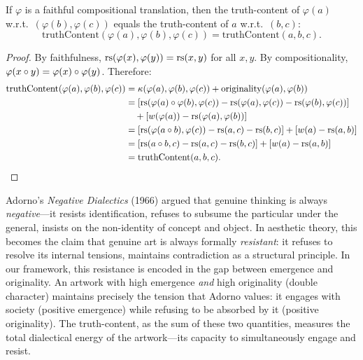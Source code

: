 \begin{theorem}
\label{thm:truth-faithful-translation}
If $\varphi$ is a faithful compositional translation, then the truth-content of $\varphi(a)$ w.r.t.\ $(\varphi(b), \varphi(c))$ equals the truth-content of $a$ w.r.t.\ $(b, c)$:
\[
  \mathrm{truthContent}(\varphi(a), \varphi(b), \varphi(c)) = \mathrm{truthContent}(a, b, c).
\]
\end{theorem}

\begin{proof}
By faithfulness, $\mathrm{rs}(\varphi(x), \varphi(y)) = \mathrm{rs}(x, y)$ for all $x, y$.  By compositionality, $\varphi(x \circ y) = \varphi(x) \circ \varphi(y)$.  Therefore:
\begin{align*}
  \mathrm{truthContent}(\varphi(a), \varphi(b), \varphi(c))
    &= \kappa(\varphi(a), \varphi(b), \varphi(c)) + \mathrm{originality}(\varphi(a), \varphi(b)) \\
    &= [\mathrm{rs}(\varphi(a) \circ \varphi(b), \varphi(c)) - \mathrm{rs}(\varphi(a), \varphi(c)) - \mathrm{rs}(\varphi(b), \varphi(c))] \\
    &\quad + [w(\varphi(a)) - \mathrm{rs}(\varphi(a), \varphi(b))] \\
    &= [\mathrm{rs}(\varphi(a \circ b), \varphi(c)) - \mathrm{rs}(a, c) - \mathrm{rs}(b, c)] + [w(a) - \mathrm{rs}(a, b)] \\
    &= [\mathrm{rs}(a \circ b, c) - \mathrm{rs}(a, c) - \mathrm{rs}(b, c)] + [w(a) - \mathrm{rs}(a, b)] \\
    &= \mathrm{truthContent}(a, b, c).
\end{align*}
\end{proof}

\begin{remark}
Adorno's \textit{Negative Dialectics} (1966) argued that genuine thinking is always \emph{negative}---it resists identification, refuses to subsume the particular under the general, insists on the non-identity of concept and object.  In aesthetic theory, this becomes the claim that genuine art is always formally \emph{resistant}: it refuses to resolve its internal tensions, maintains contradiction as a structural principle.  In our framework, this resistance is encoded in the gap between emergence and originality.  An artwork with high emergence \emph{and} high originality (double character) maintains precisely the tension that Adorno values: it engages with society (positive emergence) while refusing to be absorbed by it (positive originality).  The truth-content, as the sum of these two quantities, measures the total dialectical energy of the artwork---its capacity to simultaneously engage and resist.
\end{remark}

